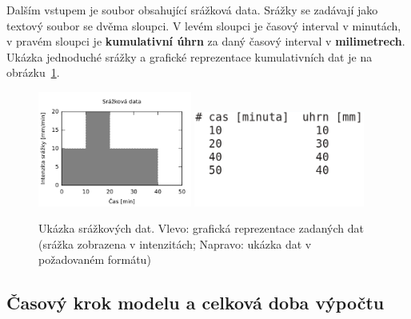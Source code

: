Dalším vstupem je soubor obsahující srážková data. 
% 
% 
% 
Srážky se zadávají jako textový soubor se dvěma sloupci. V levém sloupci je časový interval v minutách, v pravém sloupci je \textbf{kumulativní úhrn} za daný časový interval v \textbf{milimetrech}. Ukázka jednoduché srážky a grafické reprezentace kumulativních dat je na obrázku~\ref{fig:srazkovysoubor}. 
\begin{figure}
  \centering
  \includegraphics[width=0.45\textwidth]{./img/srazka-graf.png}
  \includegraphics[width=0.5\textwidth]{./img/srazka-soubor.png}
  \caption{Ukázka srážkových dat. Vlevo: grafická reprezentace zadaných dat (srážka zobrazena v intenzitách; Napravo: ukázka dat v požadovaném formátu)}
  \label{fig:srazkovysoubor}
\end{figure}














\subsection{Časový krok modelu a celková doba výpočtu} \label{sec:vstupkrok}

